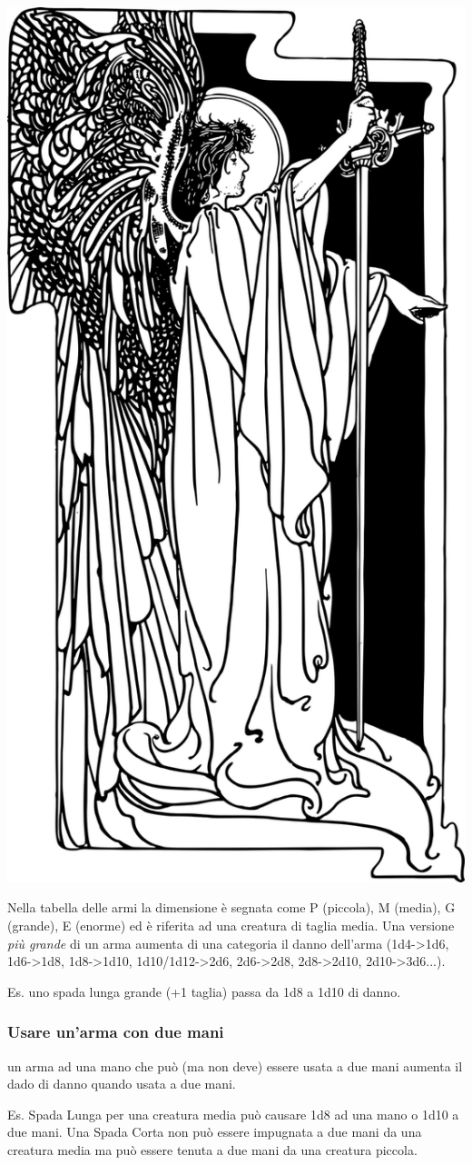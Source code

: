 \begin{multicols}{2}
\begin{center}
	\includegraphics[width=0.55\linewidth]{immagini/angelospadone.png}
\end{center}


Nella tabella delle armi la dimensione è segnata come P (piccola), M (media), G (grande), E (enorme) ed è riferita ad una creatura di taglia media. Una versione \emph{più grande} di un arma aumenta di una categoria il danno dell'arma (1d4->1d6, 1d6->1d8, 1d8->1d10, 1d10/1d12->2d6, 2d6->2d8, 2d8->2d10, 2d10->3d6...).

Es. uno spada lunga grande (+1 taglia) passa da 1d8 a 1d10 di danno.


\subsubsection{Usare un'arma con due mani} \label{usarearmaconduemani}

un arma ad una mano che può (ma non deve) essere usata a due mani aumenta il dado di danno quando usata a due mani.

Es. Spada Lunga per una creatura media può causare 1d8 ad una mano o 1d10 a due mani. Una Spada Corta non può essere impugnata a due mani da una creatura media ma può essere tenuta a due mani da una creatura piccola.


\end{multicols}
